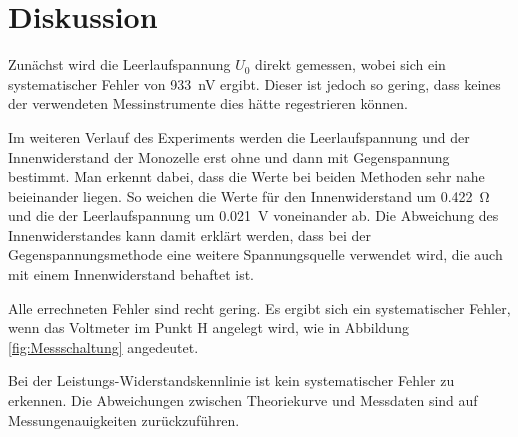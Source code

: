 \section{Diskussion}
\label{sec:Diskussion}

Zunächst wird die Leerlaufspannung $U_0$ direkt gemessen, wobei sich ein 
systematischer Fehler von \SI{933}{\nano\volt} ergibt. Dieser ist jedoch 
so gering, dass keines der verwendeten Messinstrumente dies hätte regestrieren 
können. 

Im weiteren Verlauf des Experiments werden die Leerlaufspannung und der 
Innenwiderstand der Monozelle erst ohne und dann mit Gegenspannung bestimmt. 
Man erkennt dabei, dass die Werte bei beiden Methoden sehr nahe beieinander 
liegen. So weichen die Werte für den Innenwiderstand um \SI{0.422}{\ohm} 
und die der Leerlaufspannung um \SI{0.021}{\volt} voneinander ab. 
Die Abweichung des Innenwiderstandes kann damit erklärt werden, dass bei 
der Gegenspannungsmethode eine weitere Spannungsquelle verwendet wird, die 
auch mit einem Innenwiderstand behaftet ist. 

Alle errechneten Fehler sind recht gering. Es ergibt sich ein systematischer Fehler, 
wenn das Voltmeter im Punkt H angelegt wird, wie in Abbildung \ref{fig:Messschaltung}
angedeutet. 

Bei der Leistungs-Widerstandskennlinie ist kein systematischer Fehler 
zu erkennen. Die Abweichungen zwischen Theoriekurve und Messdaten sind
auf Messungenauigkeiten zurückzuführen. 